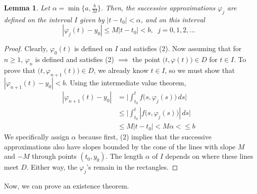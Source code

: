 \documentclass{article}
\newtheorem{lemma}[theorem]{Lemma}
\theoremstyle{remark}
\theoremstyle{definition}
\begin{document}
    \begin{lemma}
    Let $\alpha = \min\{a, \frac{b}{M}\}$. Then, the successive approximations $\varphi_j$ are defined on the interval $I$ given by $|t - t_0| < \alpha$, and on this interval 
    \begin{equation}
        |\varphi_j (t) - y_0| \leq M |t - t_0| < b, \;\; j = 0, 1, 2, ...
    \end{equation}
    \end{lemma}
    \begin{proof}
    Clearly, $\varphi_0 (t)$ is defined on $I$ and satisfies (2). Now assuming that for $n \geq 1$, $\varphi_n$ is defined and satisfies (2) $\implies$ the point $\big( t, \varphi(t)\big) \in D$ for $t \in I$. To prove that $\big(t, \varphi_{n+1}(t)\big) \in D$, we already know $t \in I$, so we must show that $|\varphi_{n+1} (t) - y_0| < b$. Using the intermediate value theorem,
    \begin{align*}
        |\varphi_{n+1}(t) - y_0| & = \bigg| \int_{t_0}^t f\big(s, \varphi_j(s)\big) \, ds \bigg| \\
        & \leq \bigg| \int_{t_0}^t |f\big(s, \varphi_j (s)\big)|\, ds\bigg| \\
        & \leq M |t - t_0| < M\alpha < \leq b
    \end{align*}
    We specifically assign $\alpha$ because first, (2) implies that the successive approximations also have slopes bounded by the cone of the lines with slope $M$ and $-M$ through points $(t_0, y_0)$. The length $\alpha$ of $I$ depends on where these lines meet $D$. Either way, the $\varphi_j$'s remain in the rectangles.
    \end{proof}

    Now, we can prove an existence theorem. 
\end{document}
